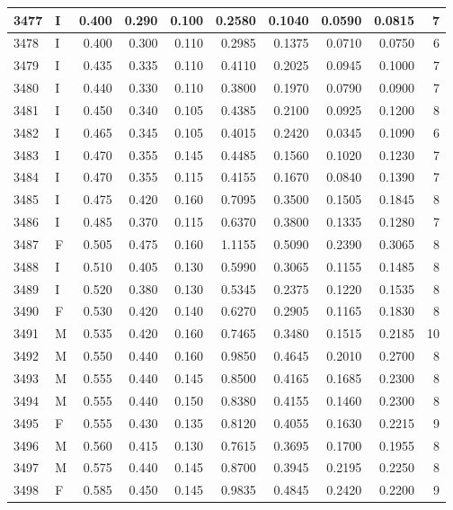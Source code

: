 \documentclass[9pt,twocolumn,twoside,]{pnas-new}
\begin{document}
\begin{tabular}{l|l|r|r|r|r|r|r|r|r}
\hline
3477 & I & 0.400 & 0.290 & 0.100 & 0.2580 & 0.1040 & 0.0590 & 0.0815 & 7\\
\hline
3478 & I & 0.400 & 0.300 & 0.110 & 0.2985 & 0.1375 & 0.0710 & 0.0750 & 6\\
\hline
3479 & I & 0.435 & 0.335 & 0.110 & 0.4110 & 0.2025 & 0.0945 & 0.1000 & 7\\
\hline
3480 & I & 0.440 & 0.330 & 0.110 & 0.3800 & 0.1970 & 0.0790 & 0.0900 & 7\\
\hline
3481 & I & 0.450 & 0.340 & 0.105 & 0.4385 & 0.2100 & 0.0925 & 0.1200 & 8\\
\hline
3482 & I & 0.465 & 0.345 & 0.105 & 0.4015 & 0.2420 & 0.0345 & 0.1090 & 6\\
\hline
3483 & I & 0.470 & 0.355 & 0.145 & 0.4485 & 0.1560 & 0.1020 & 0.1230 & 7\\
\hline
3484 & I & 0.470 & 0.355 & 0.115 & 0.4155 & 0.1670 & 0.0840 & 0.1390 & 7\\
\hline
3485 & I & 0.475 & 0.420 & 0.160 & 0.7095 & 0.3500 & 0.1505 & 0.1845 & 8\\
\hline
3486 & I & 0.485 & 0.370 & 0.115 & 0.6370 & 0.3800 & 0.1335 & 0.1280 & 7\\
\hline
3487 & F & 0.505 & 0.475 & 0.160 & 1.1155 & 0.5090 & 0.2390 & 0.3065 & 8\\
\hline
3488 & I & 0.510 & 0.405 & 0.130 & 0.5990 & 0.3065 & 0.1155 & 0.1485 & 8\\
\hline
3489 & I & 0.520 & 0.380 & 0.130 & 0.5345 & 0.2375 & 0.1220 & 0.1535 & 8\\
\hline
3490 & F & 0.530 & 0.420 & 0.140 & 0.6270 & 0.2905 & 0.1165 & 0.1830 & 8\\
\hline
3491 & M & 0.535 & 0.420 & 0.160 & 0.7465 & 0.3480 & 0.1515 & 0.2185 & 10\\
\hline
3492 & M & 0.550 & 0.440 & 0.160 & 0.9850 & 0.4645 & 0.2010 & 0.2700 & 8\\
\hline
3493 & M & 0.555 & 0.440 & 0.145 & 0.8500 & 0.4165 & 0.1685 & 0.2300 & 8\\
\hline
3494 & M & 0.555 & 0.440 & 0.150 & 0.8380 & 0.4155 & 0.1460 & 0.2300 & 8\\
\hline
3495 & F & 0.555 & 0.430 & 0.135 & 0.8120 & 0.4055 & 0.1630 & 0.2215 & 9\\
\hline
3496 & M & 0.560 & 0.415 & 0.130 & 0.7615 & 0.3695 & 0.1700 & 0.1955 & 8\\
\hline
3497 & M & 0.575 & 0.440 & 0.145 & 0.8700 & 0.3945 & 0.2195 & 0.2250 & 8\\
\hline
3498 & F & 0.585 & 0.450 & 0.145 & 0.9835 & 0.4845 & 0.2420 & 0.2200 & 9\\

\end{tabular}
\end{document}
